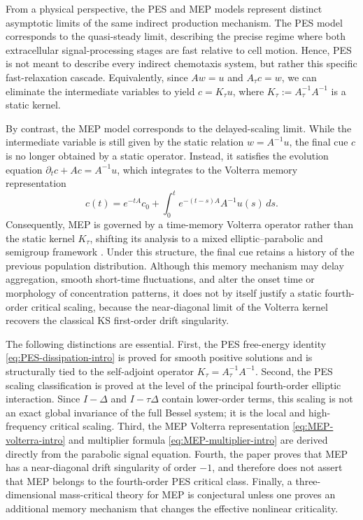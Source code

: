 \documentclass[pdflatex,sn-mathphys-num]{sn-jnl}%
\theoremstyle{thmstyleone}
\theoremstyle{thmstyletwo}
\theoremstyle{thmstylethree}
\begin{document}
From a physical perspective, the PES and MEP models represent distinct asymptotic limits of the same indirect production mechanism. The PES model corresponds to the quasi-steady limit, describing the precise regime where both extracellular signal-processing stages are fast relative to cell motion. Hence, PES is not meant to describe every indirect chemotaxis system, but rather this specific fast-relaxation cascade. Equivalently, since \(Aw=u\) and \(A_\tau c=w\), we can eliminate the intermediate variables to yield \(c=K_\tau u\), where \(K_\tau:=A_\tau^{-1}A^{-1}\) is a static kernel. 

By contrast, the MEP model corresponds to the delayed-scaling limit. While the intermediate variable is still given by the static relation \(w=A^{-1}u\), the final cue \(c\) is no longer obtained by a static operator. Instead, it satisfies the evolution equation \(\partial_t c+Ac=A^{-1}u\), which integrates to the Volterra memory representation
\begin{equation}
\label{eq:MEP-volterra-intro}
c(t)=e^{-tA}c_0+\int_0^t e^{-(t-s)A}A^{-1}u(s)\,ds.
\end{equation}
Consequently, MEP is governed by a time-memory Volterra operator rather than the static kernel \(K_\tau\), shifting its analysis to a mixed elliptic--parabolic and semigroup framework \cite{pazy2012semigroups,henry1981geometric,lunardi2012analytic,pruss2016moving}. Under this structure, the final cue retains a history of the previous population distribution. Although this memory mechanism may delay aggregation, smooth short-time fluctuations, and alter the onset time or morphology of concentration patterns, it does not by itself justify a static fourth-order critical scaling, because the near-diagonal limit of the Volterra kernel recovers the classical KS first-order drift singularity.

The following distinctions are essential.  First, the PES free-energy identity \eqref{eq:PES-dissipation-intro} is proved for smooth positive solutions and is structurally tied to the self-adjoint operator \(K_\tau=A_\tau^{-1}A^{-1}\).  Second, the PES scaling classification is proved at the level of the principal fourth-order elliptic interaction.  Since \(I-\Delta\) and \(I-\tau\Delta\) contain lower-order terms, this scaling is not an exact global invariance of the full Bessel system; it is the local and high-frequency critical scaling.  Third, the MEP Volterra representation \eqref{eq:MEP-volterra-intro} and multiplier formula \eqref{eq:MEP-multiplier-intro} are derived directly from the parabolic signal equation.  Fourth, the paper proves that MEP has a near-diagonal drift singularity of order \(-1\), and therefore does not assert that MEP belongs to the fourth-order PES critical class.  Finally, a three-dimensional mass-critical theory for MEP is conjectural unless one proves an additional memory mechanism that changes the effective nonlinear criticality.
\end{document}
